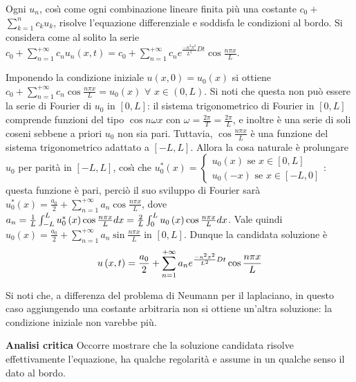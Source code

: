 \documentclass{article}
\begin{document}
Ogni $u_{n}$, cos\`{\i} come ogni combinazione lineare finita pi\`{u} una
costante $c_{0}+$ $\sum_{k=1}^{n}c_{k}u_{k}$, risolve l'equazione
differenziale e soddisfa le condizioni al bordo. Si considera come al solito
la serie $c_{0}+\sum_{n=1}^{+\infty }c_{n}u_{n}\left( x,t\right)
=c_{0}+\sum_{n=1}^{+\infty }c_{n}e^{\frac{-n^{2}\pi ^{2}}{L^{2}}Dt}\cos 
\frac{n\pi x}{L}$.

Imponendo la condizione iniziale $u\left( x,0\right) =u_{0}\left( x\right) $
si ottiene $c_{0}+\sum_{n=1}^{+\infty }c_{n}\cos \frac{n\pi x}{L}%
=u_{0}\left( x\right) $ $\forall $ $x\in \left( 0,L\right) $. Si noti che
questa non pu\`{o} essere la serie di Fourier di $u_{0}$ in $\left[ 0,L%
\right] $: il sistema trigonometrico di Fourier in $\left[ 0,L\right] $
comprende funzioni del tipo $\cos n\omega x$ con $\omega =\frac{2\pi }{T}=%
\frac{2\pi }{L}$, e inoltre \`{e} una serie di soli coseni sebbene a priori $%
u_{0}$ non sia pari. Tuttavia, $\cos \frac{n\pi x}{L}$ \`{e} una funzione
del sistema trigonometrico adattato a $\left[ -L,L\right] $. Allora la cosa
naturale \`{e} prolungare $u_{0}$ per parit\`{a} in $\left[ -L,L\right] $,
cos\`{\i} che $u_{0}^{\ast }\left( x\right) =\left\{ 
\begin{array}{c}
u_{0}\left( x\right) \text{ se }x\in \left[ 0,L\right] \\ 
u_{0}\left( -x\right) \text{ se }x\in \left[ -L,0\right]%
\end{array}%
\right. $: questa funzione \`{e} pari, perci\`{o} il suo sviluppo di Fourier
sar\`{a} $u_{0}^{\ast }\left( x\right) =\frac{a_{0}}{2}+\sum_{n=1}^{+\infty
}a_{n}\cos \frac{n\pi x}{L}$, dove $a_{n}=\frac{1}{L}\int_{-L}^{L}u_{0}^{%
\ast }\left( x\right) \cos \frac{n\pi x}{L}dx=\frac{2}{L}\int_{0}^{L}u_{0}%
\left( x\right) \cos \frac{n\pi x}{L}dx$. Vale quindi $u_{0}\left( x\right) =%
\frac{a_{0}}{2}+\sum_{n=1}^{+\infty }a_{n}\sin \frac{n\pi x}{L}$ in $\left[
0,L\right] $. Dunque la candidata soluzione \`{e} 
\begin{equation*}
u\left( x,t\right) =\frac{a_{0}}{2}+\sum_{n=1}^{+\infty }a_{n}e^{\frac{%
-n^{2}\pi ^{2}}{L^{2}}Dt}\cos \frac{n\pi x}{L}
\end{equation*}

Si noti che, a differenza del problema di Neumann per il laplaciano, in
questo caso aggiungendo una costante arbitraria non si ottiene un'altra
soluzione: la condizione iniziale non varebbe pi\`{u}.

\textbf{Analisi critica} Occorre mostrare che la soluzione candidata risolve
effettivamente l'equazione, ha qualche regolarit\`{a} e assume in un qualche
senso il dato al bordo.
\end{document}
